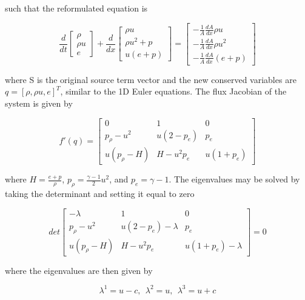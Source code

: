\documentclass{article}%
\numberwithin{equation}{section}
\begin{document}
such that the reformulated equation is 

\begin{equation}
\frac{d}{dt} \left[ \begin{array}{c} \rho  \\ \rho u  \\ e \end{array} \right] + \frac{d}{dx} \left[ \begin{array}{c} \rho u  \\ \rho u^2 + p \\ u(e + p) \end{array} \right] = \left[ \begin{array}{c} -\frac{1}{A}\frac{dA}{dx} \rho u \\ -\frac{1}{A} \frac{dA}{dx} \rho u^2  \\ -\frac{1}{A} \frac{dA}{dx}  (e + p) \end{array} \right]
\end{equation}

where S is the original source term vector and the new conserved variables are $q = [\rho, \rho u, e]^T$, similar to the 1D Euler equations. The flux Jacobian of the system is given by

\begin{equation}
f'(q) = \left[ \begin{array}{ccc} 0 & 1 & 0 \\ p_{\rho} - u^2 &  u(2 - p_e) &  p_e \\  u(p_\rho - H) & H - u^2 p_e  &  u(1 + p_e) \end{array} \right] \label{1deulerjacobian}
\end{equation}

where $H = \frac{e + p}{\rho}$, $p_\rho = \frac{\gamma - 1}{2} u^2 $, and $p_e = \gamma - 1$. The eigenvalues may be solved by taking the determinant and setting it equal to zero

\begin{equation}
det \left[ \begin{array}{ccc} -\lambda & 1 & 0 \\ p_{\rho} - u^2 &  u(2 - p_e) - \lambda &  p_e \\  u(p_\rho - H) & H - u^2 p_e  &  u(1 + p_e) - \lambda \end{array} \right] = 0
\end{equation}

where the eigenvalues are then given by 

\begin{equation}
\lambda^1 = u - c,  \ \ \lambda^2 =u , \ \ \lambda^3 = u + c \label{eigval}
\end{equation}
\end{document}
